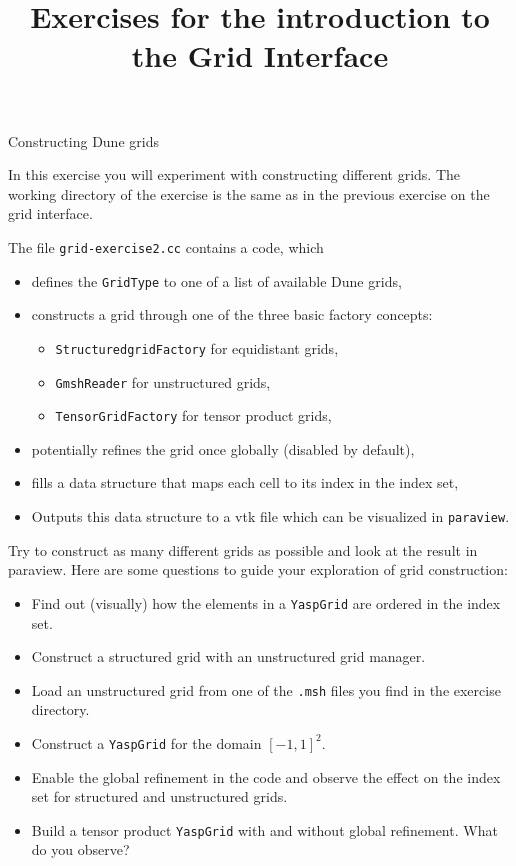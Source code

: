 \documentclass[12pt,a4paper]{article}
\title{\textbf{Exercises for the introduction to the Grid Interface}}
\begin{document}
\exerciseheader

\begin{Exercise}{Constructing Dune grids}

In this exercise you will experiment with constructing different grids. The working directory
of the exercise is the same as in the previous exercise on the grid interface.

The file \lstinline!grid-exercise2.cc! contains a code, which
\begin{itemize}
 \item defines the \lstinline!GridType! to one of a list of available Dune grids,
 \item constructs a grid through one of the three basic factory concepts:
  \begin{itemize}
   \item \lstinline!StructuredgridFactory! for equidistant grids,
   \item \lstinline!GmshReader! for unstructured grids,
   \item \lstinline!TensorGridFactory! for tensor product grids,
  \end{itemize}
 \item potentially refines the grid once globally (disabled by default),
 \item fills a data structure that maps each cell to its index in the index set,
 \item Outputs this data structure to a vtk file which can be visualized in \lstinline!paraview!.
\end{itemize}

Try to construct as many different grids as possible and look at the result in paraview.
Here are some questions to guide your exploration of grid construction:
\begin{itemize}
 \item Find out (visually) how the elements in a \lstinline!YaspGrid! are ordered in the index set.
 \item Construct a structured grid with an unstructured grid manager.
 \item Load an unstructured grid from one of the \lstinline!.msh! files you find in the exercise directory.
 \item Construct a \lstinline!YaspGrid! for the domain $[-1,1]^2$.
 \item Enable the global refinement in the code and observe the effect on the index set for structured and unstructured grids.
 \item Build a tensor product \lstinline!YaspGrid! with and without global refinement. What do you observe?
\end{itemize}

\end{Exercise}
\end{document}
